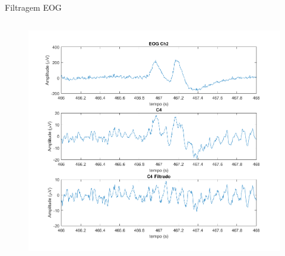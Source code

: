 \documentclass{beamer}
\begin{document}
\begin{frame}{Filtragem EOG}
    \begin{columns}
        \begin{column}{0.5\textwidth}
           \begin{center}
               \begin{figure}
                   \centering
                   \includegraphics[scale=0.20]{Images/FiltragemEOG.png}
               \end{figure}
           \end{center}
         \end{column}
    \end{columns}           
\end{frame}


\end{document}
